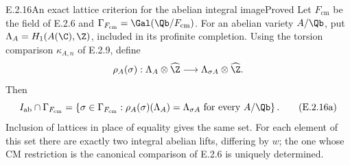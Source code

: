 \begin{result}{E.2.16}{An exact lattice criterion for the abelian integral image}{Proved}
Let \(F_{\mathrm{cm}}\) be the field of E.2.6 and
\(\Gamma_{F_{\mathrm{cm}}}=\Gal(\Qb/F_{\mathrm{cm}})\).
For an abelian variety \(A/\Qb\), put
\(\Lambda_A=H_1(A(\C),\Z)\), included in its profinite
completion. Using the torsion comparison \(\kappa_{A,n}\)
of E.2.9, define
\[
 \rho_A(\sigma):
 \Lambda_A\otimes\widehat\Z
 \longrightarrow\Lambda_{\sigma A}\otimes\widehat\Z .
\]
Then
\[
 I_{\mathrm{ab}}\cap\Gamma_{F_{\mathrm{cm}}}
 =
 \left\{\sigma\in\Gamma_{F_{\mathrm{cm}}}:
   \rho_A(\sigma)(\Lambda_A)=\Lambda_{\sigma A}
   \text{ for every }A/\Qb\right\}.
 \tag{E.2.16a}
\]
Inclusion of lattices in place of equality gives the same set.
For each element of this set there are exactly two integral
abelian lifts, differing by \(w\); the one whose CM restriction
is the canonical comparison of E.2.6 is uniquely determined.
\end{result}
